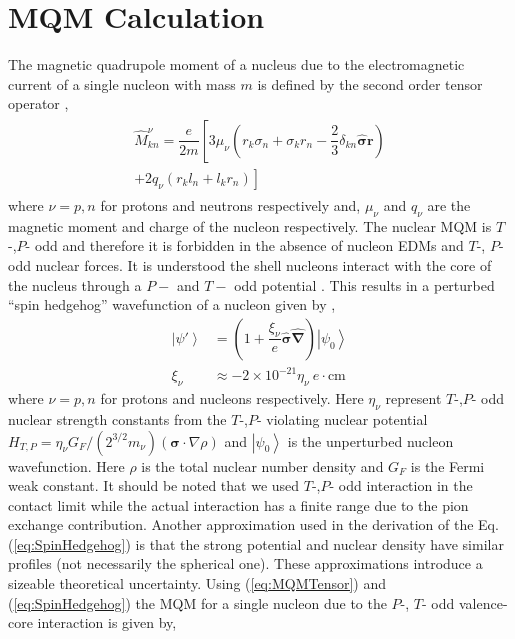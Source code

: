 \documentclass[10pt,a4paper, twoside]{report}
\begin{document}
\fi
\section{MQM  Calculation}
The magnetic quadrupole moment of a nucleus due to the electromagnetic current of a single nucleon with mass $m$ is defined by the second order tensor operator \cite{SFK1984},
\begin{align} \label{eq:MQMTensor}
\begin{split}
\hat{M}_{kn}^{\nu} = \dfrac{e}{2m}\left[3\mu_{\nu}\left(r_k\sigma_n + \sigma_kr_n - \dfrac{2}{3}\delta_{kn}\hat{\boldsymbol{\sigma}}\textbf{r}\right) \right. \\
\left. + 2q_{\nu}\left(r_kl_n + l_kr_n\right)\right]
\end{split}
\end{align}
where $\nu = p,n$ for protons and neutrons respectively and, $\mu_{\nu}$ and $q_{\nu}$ are the magnetic moment and charge of the nucleon respectively. The nuclear MQM is $T$-,$P$- odd and therefore it is forbidden in the absence of nucleon EDMs and $T$-, $P$- odd nuclear forces. It is understood the shell nucleons interact with the core of the nucleus through a $P-$ and $T-$ odd potential \cite{Flambaum1994, SFK1984, KhriplovichPNC}. This results in a perturbed ``spin hedgehog'' wavefunction of a nucleon given by \cite{SFK1984, Flambaum1994},
\begin{align} \label{eq:SpinHedgehog}
\left|\psi'\right> &= \left(1 + \dfrac{\xi_{\nu}}{e}\hat{\boldsymbol{\sigma}}\hat{\boldsymbol{\nabla}}\right)\left|\psi_0\right> \\
\xi_{\nu} &\approx -2\times 10^{-21}\eta_{\nu} \ e\cdot\text{cm} \nonumber
\end{align}
where $\nu = p,n$ for protons and nucleons respectively. Here $\eta_{\nu}$ represent $T$-,$P$- odd nuclear strength constants from the $T$-,$P$- violating nuclear potential $H_{T,P} = \eta_{\nu}G_{F}/(2^{3/2}m_{\nu})(\boldsymbol{\sigma}\cdot \nabla\rho)$ and $\left|\psi_0\right>$ is the unperturbed nucleon wavefunction. Here $\rho$ is the total nuclear number density and $G_{F}$ is the Fermi weak constant.  It should be noted that we used   $T$-,$P$- odd interaction in the contact limit while the actual interaction has a finite range due to the pion exchange contribution. Another approximation used in the derivation of the Eq. (\ref{eq:SpinHedgehog}) is that the strong potential and nuclear density have similar profiles (not necessarily the  spherical one). These approximations introduce a sizeable theoretical uncertainty.  Using (\ref{eq:MQMTensor}) and (\ref{eq:SpinHedgehog}) the MQM for a single nucleon due to the $P$-, $T$- odd valence-core interaction is given by,
\end{document}
